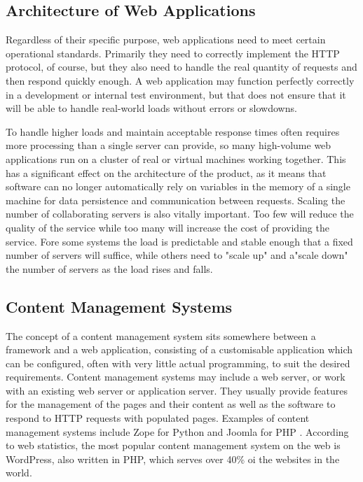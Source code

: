 \subsection{Architecture of Web Applications}
Regardless of their specific purpose, web applications need to meet certain operational standards. Primarily they need to correctly implement the HTTP protocol, of course, but they also need to handle the real quantity of requests and then respond quickly enough. A web application may function perfectly correctly in a development or internal test environment, but that does not ensure that it will be able to handle real-world loads without errors or slowdowns.

To handle higher loads and maintain acceptable response times often requires more processing than a single server can provide, so many high-volume web applications run on a cluster of real or virtual machines working together. This has a significant effect on the architecture of the product, as it means that software can no longer automatically rely on variables in the memory of a single machine for data persistence and communication between requests. Scaling the number of collaborating servers is also vitally important. Too few will reduce the quality of the service while too many will increase the cost of providing the service. Fore some systems the load is predictable and stable enough that a fixed number of servers will suffice, while others need to "scale up" and a"scale down" the number of servers as the load rises and falls.

\subsection{Content Management Systems}
The concept of a content management system sits somewhere between a framework and a web application, consisting of a customisable application which can be configured, often with very little actual programming, to suit the desired requirements. Content management systems may include a web server, or work with an existing web server or application server. They usually provide features for the management of the pages and their content as well as the software to respond to HTTP requests with populated pages. Examples of content management systems include Zope for Python  and Joomla for PHP . According to web statistics, the most popular content management system on the web is WordPress, also written in PHP, which serves over 40\% oi the websites in the world. 

